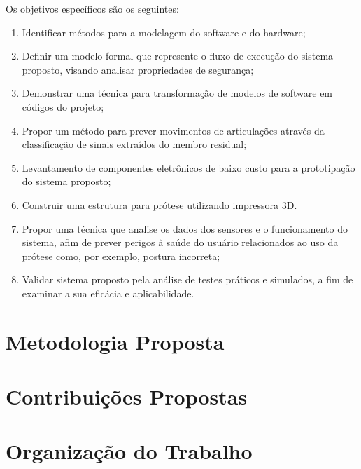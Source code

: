 
Os objetivos específicos são os seguintes:
\begin{enumerate}
  \item Identificar métodos para a modelagem do software e do hardware;
  \item Definir um modelo formal que represente o fluxo de execução do sistema proposto, visando analisar propriedades de segurança;
  \item Demonstrar uma técnica para transformação de modelos de software em códigos do projeto;
  \item Propor um método para prever movimentos de articulações através da classificação de sinais extraídos do membro residual;
  \item Levantamento de componentes eletrônicos de baixo custo para a prototipação do sistema proposto;
  \item Construir uma estrutura para prótese utilizando impressora 3D.
  \item Propor uma técnica que analise os dados dos sensores e o funcionamento do sistema, afim de prever perigos à saúde do usuário relacionados ao uso da prótese como, por exemplo, postura incorreta;
  \item Validar sistema proposto pela análise de testes práticos e simulados, a fim de examinar a sua eficácia e aplicabilidade.   
\end{enumerate}

\section{Metodologia Proposta}
\label{sec:metodologia}

\section{Contribuições Propostas}
\label{sec:contribuicoes}

\section{Organização do Trabalho}
\label{sec:organizacao}
